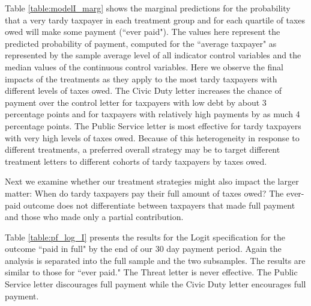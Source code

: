 \documentclass[12pt,titlepage]{article}
\begin{document}
Table \ref{table:modelI_marg} shows the marginal predictions for the probability that
a very tardy taxpayer in each treatment group and for each quartile of
taxes owed will make some payment (``ever paid").  The values here
represent the predicted probability of payment, computed for the
``average taxpayer" as represented by the sample average level of all
indicator control variables and the median values of the continuous
control variables.  Here we observe the final impacts of the
treatments as they apply to the most tardy taxpayers with different
levels of taxes owed.  The Civic Duty letter increases the chance of
payment over the control letter for taxpayers with low debt by about 3
percentage points and for taxpayers with relatively high payments by
as much 4 percentage points.  The Public Service letter is most
effective for tardy taxpayers with very high levels of taxes owed.
Because of this heterogeneity in response to different treatments, a
preferred overall strategy may be to target different treatment
letters to different cohorts of tardy taxpayers by taxes owed.

Next we examine whether our treatment strategies might also impact the
larger matter: When do tardy taxpayers pay their full amount of taxes
owed?  The ever-paid outcome does not differentiate between taxpayers
that made full payment and those who made only a partial contribution.

Table \ref{table:pf_log_I} presents the results for the Logit specification for
the outcome ``paid in full" by the end of our 30 day payment period.
Again the analysis is separated into the full sample and the
two subsamples.  The results are similar to those for ``ever paid."
The Threat letter is never effective.  The Public Service letter
discourages full payment while the Civic Duty letter encourages full
payment.
\end{document}
